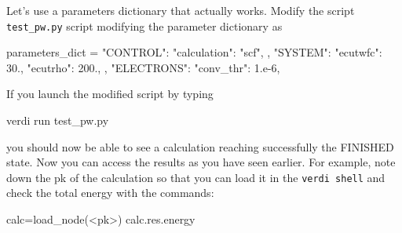 Let's use a parameters dictionary that actually works.
Modify the script \texttt{test\_pw.py} script modifying the parameter dictionary as
\begin{pythoncommand}
parameters_dict = {
    "CONTROL": {"calculation": "scf",
                },
    "SYSTEM": {"ecutwfc": 30.,
               "ecutrho": 200.,
               },
    "ELECTRONS": {"conv_thr": 1.e-6,
                  }
    }
\end{pythoncommand}

If you launch the modified script by typing
\begin{pythoncommand}
 verdi run test_pw.py
\end{pythoncommand}
you should now be able to see a calculation reaching successfully the FINISHED state.
Now you can access the results as you have seen earlier.
For example, note down the pk of the calculation so that you can load it in the \texttt{verdi shell} and check the total energy with the commands:
\begin{pythoncommand}
calc=load_node(<pk>)
calc.res.energy
\end{pythoncommand}

% 







